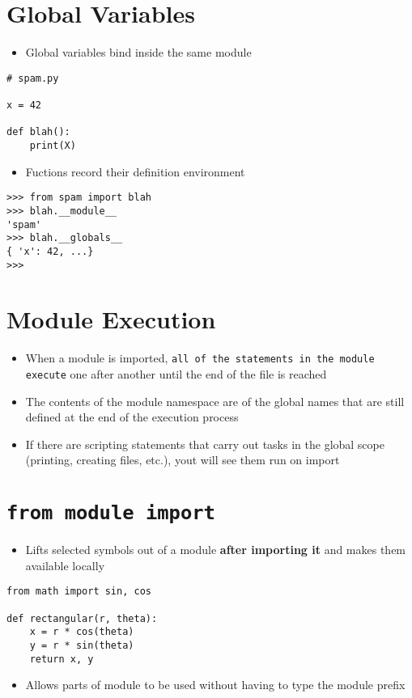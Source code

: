 \documentclass[11pt]{article}
\begin{document}
\section*{Global Variables}
\label{sec:orgheadline3}
\begin{itemize}
\item Global variables bind inside the same module
\end{itemize}
\begin{verbatim}
# spam.py

x = 42

def blah():
    print(X)
\end{verbatim}
\begin{itemize}
\item Fuctions record their definition environment
\end{itemize}
\begin{verbatim}
>>> from spam import blah
>>> blah.__module__
'spam'
>>> blah.__globals__
{ 'x': 42, ...}
>>>
\end{verbatim}

\section*{Module Execution}
\label{sec:orgheadline4}
\begin{itemize}
\item When a module is imported, \texttt{all of the
  statements in the module execute} one after
another until the end of the file is reached
\item The contents of the  module namespace are of the
global names that are still defined at the end
of the execution process
\item If there are scripting statements that carry out
tasks in the global scope (printing, creating
files, etc.), yout will see them run on import
\end{itemize}

\section*{\texttt{from module import}}
\label{sec:orgheadline11}
\begin{itemize}
\item Lifts selected symbols out of a module \textbf{after
importing it} and  makes them available locally
\end{itemize}
\begin{verbatim}
from math import sin, cos

def rectangular(r, theta):
    x = r * cos(theta)
    y = r * sin(theta)
    return x, y
\end{verbatim}
\begin{itemize}
\item Allows parts of module to be used without having
to type the module prefix
\end{itemize}
\end{document}
